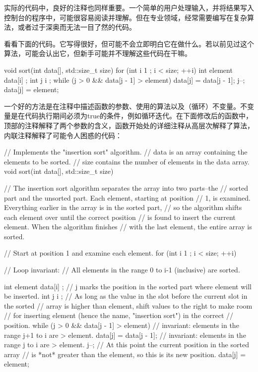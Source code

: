 
实际的代码中，良好的注释也同样重要。一个简单的用户处理输入，并将结果写入控制台的程序中，可能很容易阅读并理解。但在专业领域，经常需要编写在复杂算法，或者过于深奥而无法一目了然的代码。

看看下面的代码。它写得很好，但可能不会立即明白它在做什么。若以前见过这个算法，可能会认出它，但新手可能并不理解这些代码在干嘛。

\begin{cpp}
void sort(int data[], std::size_t size)
{
    for (int i { 1 }; i < size; ++i) {
        int element { data[i] };
        int j { i };
        while (j > 0 && data[j - 1] > element) {
            data[j] = data[j - 1];
            j--;
        }
        data[j] = element;
    }
}
\end{cpp}

一个好的方法是在注释中描述函数的参数、使用的算法以及（循环）不变量。不变量是在代码执行期间必须为true的条件，例如循环迭代。在下面修改后的函数中，顶部的注释解释了两个参数的含义，函数开始处的详细注释从高层次解释了算法，内联注释解释了可能令人困惑的代码：

\begin{cpp}
// Implements the "insertion sort" algorithm.
// data is an array containing the elements to be sorted.
// size contains the number of elements in the data array.
void sort(int data[], std::size_t size)
{
    // The insertion sort algorithm separates the array into two parts--the
    // sorted part and the unsorted part. Each element, starting at position
    // 1, is examined. Everything earlier in the array is in the sorted part,
    // so the algorithm shifts each element over until the correct position
    // is found to insert the current element. When the algorithm finishes
    // with the last element, the entire array is sorted.

    // Start at position 1 and examine each element.
    for (int i { 1 }; i < size; ++i) {
        // Loop invariant:
        //   All elements in the range 0 to i-1 (inclusive) are sorted.

        int element { data[i] };
        // j marks the position in the sorted part where element will be inserted.
        int j { i };
        // As long as the value in the slot before the current slot in the sorted
        // array is higher than element, shift values to the right to make room
        // for inserting element (hence the name, "insertion sort") in the correct
        // position.
        while (j > 0 && data[j - 1] > element) {
            // invariant: elements in the range j+1 to i are > element.
            data[j] = data[j - 1];
            // invariant: elements in the range j to i are > element.
            j--;
        }
        // At this point the current position in the sorted array
        // is *not* greater than the element, so this is its new position.
        data[j] = element;
    }
}
\end{cpp}


